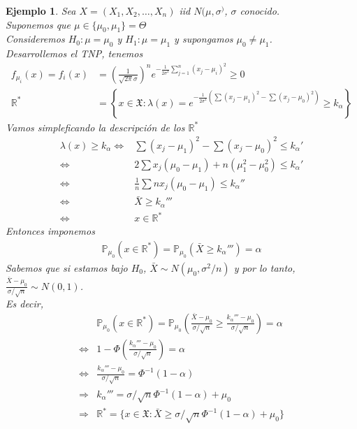 \documentclass[10pt]{article}
\theoremstyle{plain}
\newtheorem{ej}{Ejemplo}
\theoremstyle{definition}
\begin{document}
\begin{ej}
Sea $X=(X_{1},X_{2},\ldots,X_{n})$ iid $N(\mu,\sigma^)$, $\sigma$ conocido.\\
Suponemos que $\mu \in \{\mu_{0},\mu_{1}\}= \Theta$ \\
Consideremos $H_{0}: \mu = \mu_{0}$ y $H_{1}: \mu = \mu_{1}$ y supongamos $\mu_{0}\not = \mu_{1}$.\\

Desarrollemos el TNP, tenemos
\begin{align*}
f_{\mu_{i}}(x) = f_{i}(x) &= \left(\frac{1}{\sqrt{2\pi}\sigma}\right)^n e^{-\frac{1}{2\sigma^2}\sum_{j=1}^n{(x_{j}-\mu_{i})^2}}\ge 0\\
\mathbb{R}^* &= \left\lbrace x \in\mathfrak{X}\colon \lambda(x) = e^{-\frac{1}{2\sigma^2}\left(\sum{(x_{j}-\mu_{1})^2}-\sum{(x_{j}-\mu_{0})^2}\right)} \ge k_{\alpha}\right\rbrace
\end{align*}
Vamos simpleficando la descripción de los $\mathbb{R}^*$
\begin{align*}
\lambda(x) \ge k_{\alpha} \Leftrightarrow &\sum{(x_{j}-\mu_{1})^2}-\sum{(x_{j}-\mu_{0})^2} \le k_{\alpha}'\\
\Leftrightarrow & 2\sum{x_{j}(\mu_{0}-\mu_{1})} + n(\mu_{1}^2-\mu_{0}^2) \le k_{\alpha}'\\
\Leftrightarrow & \frac{1}{n} \sum {nx_{j}(\mu_{0}-\mu_{1})} \le k_{\alpha}''\\
\Leftrightarrow & \bar{X} \ge k_{\alpha}'''\\
\Leftrightarrow & x \in \mathbb{R}^*
\end{align*}
Entonces imponemos
\begin{align*}
\mathbb{P}_{\mu_{0}}(x \in \mathbb{R}^*) = \mathbb{P}_{\mu_{0}}(\bar{X} \ge k_{\alpha}''') = \alpha
\end{align*}
Sabemos que si estamos bajo $H_{0}$, $\bar{X}\sim N(\mu_{0},\sigma^2/n)$ y por lo tanto, $\frac{\bar{X}-\mu_{0}}{\sigma/\sqrt{n}} \sim N(0,1)$.\\

Es decir,
\begin{align*}
&\mathbb{P}_{\mu_{0}}(x \in \mathbb{R}^*) = \mathbb{P}_{\mu_{0}}(\frac{\bar{X}-\mu_{0}}{\sigma/\sqrt{n}} \ge \frac{k_{\alpha}'''-\mu_{0}}{\sigma/\sqrt{n}}) = \alpha \\
\Leftrightarrow & 1-\Phi\left(\frac{k_{\alpha}'''-\mu_{0}}{\sigma/\sqrt{n}}\right) = \alpha\\
\Leftrightarrow & \frac{k_{\alpha}'''-\mu_{0}}{\sigma/\sqrt{n}} = \Phi^{-1}(1-\alpha)\\
\Rightarrow & k_{\alpha}''' = \sigma/\sqrt{n} \Phi^{-1}(1-\alpha) + \mu_{0}\\
\Rightarrow & \mathbb{R}^* = \{x\in\mathfrak{X}\colon \bar{X}\ge\sigma/\sqrt{n} \Phi^{-1}(1-\alpha) + \mu_{0}\}
\end{align*}
\end{ej}
\end{document}
